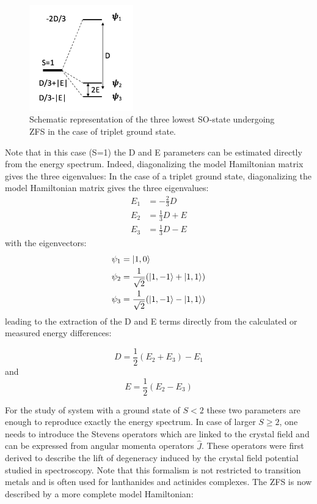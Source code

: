 \documentclass[12pt]{report}
\numberwithin{equation}{section}
\begin{document}
\begin{figure}
    \centering
    \includegraphics[width=0.4\textwidth]{Images/SpectreZFS.png}
    \caption{Schematic representation of the three lowest SO-state undergoing ZFS in the case of triplet ground state.}
\label{SpectreZFS}
\end{figure}
Note that in this case (S=1) the D and E parameters can be estimated directly from the energy spectrum. Indeed, diagonalizing the model Hamiltonian matrix gives the three eigenvalues:
In the case of a triplet ground state, diagonalizing the model Hamiltonian matrix gives the three eigenvalues:
\begin{align}
    E_1&=-\frac{2}{3}D\\
    E_2&=\frac{1}{3}D+E\\
    E_3&=\frac{1}{3}D-E
\end{align}
with the eigenvectors:
\begin{align}
    \psi_1&=\ket{1,0}\\
    \psi_2&=\frac{1}{\sqrt{2}}(\ket{1,-1}+\ket{1,1})\\
    \psi_3&=\frac{1}{\sqrt{2}}(\ket{1,-1}-\ket{1,1})
\end{align}
leading to the extraction of the D and E terms directly from the calculated or measured energy differences:

\begin{equation}
    D=\frac{1}{2}(E_2+E_3)-E_1
\end{equation}
and
\begin{equation}
    E=\frac{1}{2}(E_2-E_3)
\end{equation}

For the study of system with a ground state of $S<2$ these two parameters are enough to reproduce exactly the energy spectrum.
In case of larger $S\ge2$, one needs to introduce the Stevens operators which are linked to the crystal field and can be expressed from angular momenta operators $\hat{J}$.
These operators were first derived to describe the lift of degeneracy induced by the crystal field potential studied in spectroscopy.
Note that this formalism is not restricted to transition metals and is often used for lanthanides and actinides complexes.
The ZFS is now described by a more complete model Hamiltonian:
\end{document}
